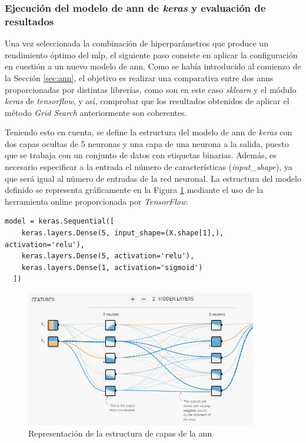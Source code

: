 \subsubsection{Ejecución del modelo de \acrshort{ann} de \textit{keras} y evaluación de resultados}

Una vez seleccionada la combinación de hiperparámetros que produce un rendimiento óptimo del \gls{mlp}, el siguiente paso consiste en aplicar la configuración en cuestión a un nuevo modelo de \gls{ann}. Como se había introducido al comienzo de la Sección \ref{sec:ann}, el objetivo es realizar una comparativa entre dos \gls{ann}s proporcionadas por distintas librerías, como son en este caso \textit{sklearn} y el módulo \textit{keras} de \textit{tensorflow}, y así, comprobar que los resultados obtenidos de aplicar el método \textit{Grid Search} anteriormente son coherentes. 

\vspace{3mm}

Teniendo esto en cuenta, se define la estructura del modelo de \gls{ann} de \textit{keras} con dos capas ocultas de 5 neuronas y una capa de una neurona a la salida, puesto que se trabaja con un conjunto de datos con etiquetas binarias. Además, es necesario especificar a la entrada el número de características (\textit{input\_shape}), ya que será igual al número de entradas de la red neuronal. La estructura del modelo definido se representa gráficamente en la Figura \ref{fig:neuronas} mediante el uso de la herramienta online proporcionada por \textit{TensorFlow}. \cite{seq}

\vspace{3mm}

\begin{lstlisting}[style=Python, caption={Definición del modelo de ANN de Keras}]
  model = keras.Sequential([
    keras.layers.Dense(5, input_shape=(X.shape[1],), activation='relu'), 
    keras.layers.Dense(5, activation='relu'),
    keras.layers.Dense(1, activation='sigmoid') 
  ]) 
\end{lstlisting}

\vspace{3mm}

\begin{figure}[H]
  \centering
  \includegraphics[width=0.9\textwidth]{img/desarrollo/ann/neuronas.png}
  \caption{Representación de la estructura de capas de la \acrshort{ann} \cite{tensorflow}}
  \label{fig:neuronas}
\end{figure}

